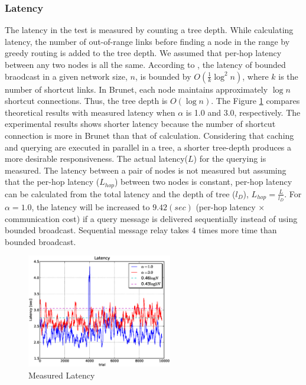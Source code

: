 \documentclass[9.5pt,journal,final,finalsubmission,twocolumn]{IEEEtran}
\begin{document}
\subsubsection{Latency}
The latency in the test is measured by counting a tree depth.
While calculating latency, the number of out-of-range links before finding a node 
in the range by greedy routing is added to the tree depth.
We assumed that per-hop latency between any two nodes is all the same.
According to \cite{to:deetoo10}, the latency of bounded braodcast in 
a given network size, $n$, is bounded by $O(\frac{1}{k}\log^2{n})$, where $k$ is 
the number of shortcut links. In Brunet, each node maintains approximately
$\log{n}$ shortcut connections. Thus, the tree depth is $O(\log{n})$.
The Figure \ref{fig:latency} compares theoretical results
with measured latency
when $\alpha$ is 1.0 and 3.0, respectively. The experimental results 
shows shorter latency because the number of shortcut connection 
is more in Brunet than that of calculation.
Considering that caching and querying are executed in parallel in a tree,
a shorter tree-depth produces a more desirable responsiveness.
The actual latency($L$) for the querying is measured. The latency between 
a pair of nodes is not measured but assuming that the per-hop latency
($L_{hop}$) between two nodes is constant, 
per-hop latency can be calculated 
from the total latency and the depth of tree ($l_D$),
$L_{hop}=\frac{L}{l_D}$.
For $\alpha=1.0$, the latency will be increased to $9.42(sec)$
(per-hop latency $\times$ communication cost) if a 
query message is delivered sequentially instead of
using bounded broadcast. Sequential message relay takes 4 times more time
than bounded broadcast. 
\begin{figure}[ht]
\centering
\includegraphics[width=2.5in]{plab_latency_sec.eps}
\caption{Measured Latency} \label{fig:latency}
\end{figure}
\end{document}
